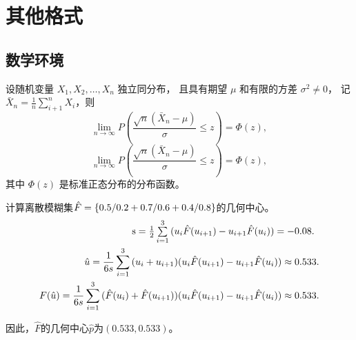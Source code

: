 \documentclass{cqupt_thesis}
\begin{document}
    \chapter{其他格式}


    \section{数学环境}
    \begin{theorem}
        设随机变量 $X_1, X_2, \dots, X_n$ 独立同分布， 且具有期望 $\mu$ 和有限的方差 $\sigma^2 \ne 0$，
        记 $\bar{X}_n = \frac{1}{n} \sum_{i+1}^n X_i$，则
        \begin{equation}
            \lim_{n \to \infty} P \left(\frac{\sqrt{n} \left( \bar{X}_n - \mu \right)}{\sigma} \le z \right) = \Phi(z),
        \end{equation}
        \begin{equation}
            \lim_{n \to \infty} P \left(\frac{\sqrt{n} \left( \bar{X}_n - \mu \right)}{\sigma} \le z \right) = \Phi(z),
        \end{equation}
        其中 $\Phi(z)$ 是标准正态分布的分布函数。
    \end{theorem}

    \begin{example}
        \setlength\abovedisplayskip{0pt}
        \setlength\belowdisplayskip{0pt}
        \setlength{\jot}{-10pt}
        计算离散模糊集$\hat F = \{ {{0.5} \mathord{\left/
                {\vphantom {{0.5} {0.2}}} \right.
            \kern-\nulldelimiterspace} {0.2}} + {{0.7} \mathord{\left/
                {\vphantom {{0.7} {0.6}}} \right.
            \kern-\nulldelimiterspace} {0.6}} + {{0.4} \mathord{\left/
                {\vphantom {{0.4} {0.8}}} \right.
            \kern-\nulldelimiterspace} {0.8}}\} $的几何中心。
        \begin{align*}
            \begin{array}{l}
            {\rm{s}}
                = \frac{1}{2}\sum\limits_{i = 1}^{3} {({u_i}\hat F(} {u_{i + 1}}) - {u_{i + 1}}\hat F({u_i})) =  - 0.08.
            \end{array} \\
            \hat u = \frac{1}{{6s}}\sum\limits_{i = 1}^{3} {({u_i} + {u_{i + 1}})} ({u_i}\hat F({u_{i + 1}}) - {u_{i + 1}}\hat F({u_i})) \approx 0.533. \\
            F(\hat u) = \frac{1}{{6s}}\sum\limits_{i = 1}^{3} {(\hat F({u_i}) + \hat F({u_{i + 1}}))} ({u_i}\hat F({u_{i + 1}}) - {u_{i + 1}}\hat F({u_i})) \approx 0.533.
        \end{align*}

        因此，$\hat F$的几何中心$\hat p$为$(0.533,0.533)$。
    \end{example}
\end{document}
